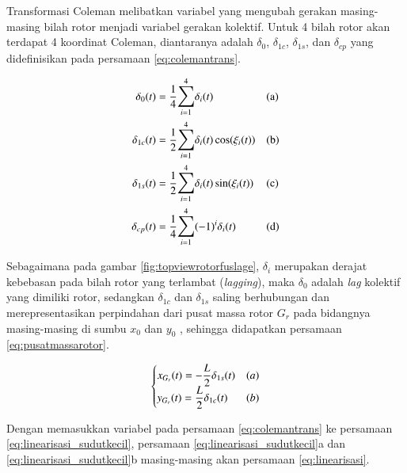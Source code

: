 Transformasi Coleman melibatkan variabel yang mengubah gerakan masing-masing bilah rotor menjadi variabel gerakan kolektif. Untuk 4 bilah rotor akan terdapat 4 koordinat Coleman, diantaranya adalah $\delta_0$, $\delta_{1c}$, $\delta_{1s}$, dan $\delta_{cp}$ yang didefinisikan pada persamaan \ref{eq:colemantrans}.

\begin{equation}
\begin{aligned}
	\delta_0(t) &= \frac{1}{4}\mathlarger{\sum}_{i=1}^{4}\delta_i(t) && \text{(a)} \\
	\delta_{1c}(t) &= \frac{1}{2}\mathlarger{\sum}_{i=1}^{4}\delta_i(t) \cos(\xi_i(t)) && \text{(b)}\\
	\delta_{1s}(t) &= \frac{1}{2}\mathlarger{\sum}_{i=1}^{4}\delta_i(t) \sin(\xi_i(t)) && \text{(c)}\\
	\delta_{cp}(t) &= \frac{1}{4}\mathlarger{\sum}_{i=1}^{4}(-1)^i\delta_i(t) && \text{(d)}
\end{aligned}
\label{eq:colemantrans}
\end{equation}

Sebagaimana pada gambar \ref{fig:topviewrotorfuslage}, $\delta_i$ merupakan derajat kebebasan pada bilah rotor yang terlambat (\textit{lagging}), maka $\delta_0$ adalah \textit{lag} kolektif yang dimiliki rotor, sedangkan $\delta_{1c}$ dan $\delta_{1s}$ saling berhubungan dan merepresentasikan perpindahan dari pusat massa rotor $G_r$ pada bidangnya masing-masing di sumbu $x_0$ dan $y_0$ \cite{inproceedings}, sehingga didapatkan persamaan \ref{eq:pusatmassarotor}.

\begin{equation}
	\begin{cases}
		x_{G_r}(t) = -\mathlarger{\frac{L}{2}}\delta_{1s}(t)&(a) \\ 
		y_{G_r}(t) = \mathlarger{\frac{L}{2}}\delta_{1c}(t)&(b)
	\end{cases}
	\label{eq:pusatmassarotor}
\end{equation}

Dengan memasukkan variabel pada persamaan \ref{eq:colemantrans} ke persamaan \ref{eq:linearisasi_sudutkecil}, persamaan \ref{eq:linearisasi_sudutkecil}a dan \ref{eq:linearisasi_sudutkecil}b masing-masing akan persamaan \ref{eq:linearisasi}.


